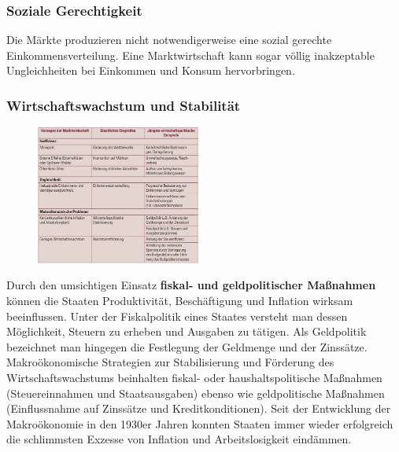 \documentclass[10pt]{scrartcl}
\begin{document}
\subsubsection{Soziale Gerechtigkeit}
Die Märkte produzieren nicht notwendigerweise eine sozial gerechte Einkommensverteilung. Eine Marktwirtschaft kann sogar völlig inakzeptable Ungleichheiten bei Einkommen und Konsum hervorbringen.
\subsubsection{Wirtschaftswachstum und Stabilität}
\begin{figure}
  \vspace{-20pt}
  \begin{center}
    \includegraphics[width=0.48\textwidth]{img/staat.jpg}
  \end{center}
   \vspace{-10pt} 
\end{figure}
Durch den umsichtigen Einsatz {\bf fiskal- und geldpolitischer Maßnahmen} können die Staaten Produktivität, Beschäftigung und Inflation wirksam beeinflussen. Unter der Fiskalpolitik eines Staates versteht man dessen Möglichkeit, Steuern zu erheben und Ausgaben zu tätigen. Als Geldpolitik bezeichnet man hingegen die Festlegung der Geldmenge und der Zinssätze. \\
Makroökonomische Strategien zur Stabilisierung und Förderung des Wirtschaftswachstums beinhalten fiskal- oder haushaltspolitische Maßnahmen (Steuereinnahmen und Staatsausgaben) ebenso wie geldpolitische Maßnahmen (Einflussnahme auf Zinssätze und Kreditkonditionen). Seit der Entwicklung der Makroökonomie in den 1930er Jahren konnten Staaten immer wieder erfolgreich die schlimmsten Exzesse von Inflation und Arbeitslosigkeit eindämmen.
\end{document}
